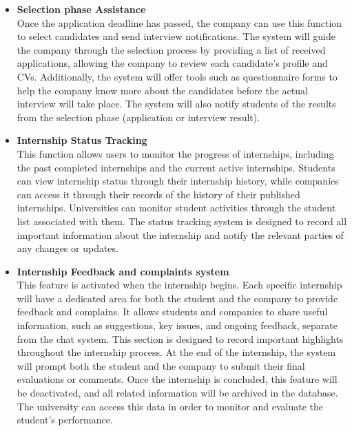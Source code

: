 \begin{itemize}[label={ }]
    \item \textcolor{bluepoli}{\textbf{Selection phase Assistance}}
    \\Once the application deadline has passed, the company can use this function to select candidates and send interview notifications. The system will 
    guide the company through the selection process by providing a list of received applications, allowing the company to review each candidate's profile 
    and CVs. Additionally, the system will offer tools such as questionnaire forms to help the company know more about the candidates before the actual 
    interview will take place. The system will also notify students of the results from the selection phase (application or interview result).

    \item \textcolor{bluepoli}{\textbf{Internship Status Tracking}}
    \\This function allows users to monitor the progress of internships, including the past completed internships and the current active internships.
    Students can view internship status through their internship history, while companies can access it through their records of the history of their 
    published internships. Universities can monitor student activities through the student list associated with them. The status tracking system
    is designed to record all important information about the internship and notify the relevant parties of any changes or updates.

    \item \textcolor{bluepoli}{\textbf{Internship Feedback and complaints system}}
    \\This feature is activated when the internship begins. Each specific internship will have a dedicated area for both the student and the company to
    provide feedback and complains.
    It allows students and companies to share useful information, such as suggestions, key issues, and ongoing feedback, separate from the chat system. 
    This section is designed to record important highlights throughout the internship process. At the end of the internship, the system will prompt both 
    the student and the company to submit their final evaluations or comments. Once the internship is concluded, this feature will be deactivated, and 
    all related information will be archived in the database. The university can access this data in order to monitor and evaluate the student's performance.


\end{itemize}
